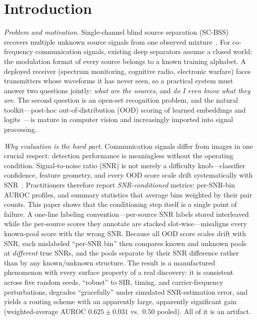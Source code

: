 \documentclass[review,12pt]{elsarticle}
\begin{document}
\linenumbers

\section{Introduction}
\label{sec:intro}

\emph{Problem and motivation.} Single-channel blind source separation
(SC-BSS) recovers multiple unknown source signals from one observed
mixture~\cite{hou2022single,guo2024single}. For co-frequency
communication signals, existing deep separators assume a closed world:
the modulation format of every source belongs to a known training
alphabet. A deployed receiver (spectrum monitoring, cognitive radio,
electronic warfare) faces transmitters whose waveforms it has never
seen, so a practical system must answer two questions jointly:
\emph{what are the sources}, and \emph{do I even know what they are}.
The second question is an open-set recognition problem, and the natural
toolkit---post-hoc out-of-distribution (OOD) scoring of learned
embeddings and
logits~\cite{hendrycks2017msp,liang2018odin,liu2020energy,lee2018mahalanobis,du2022vos}---is
mature in computer vision and increasingly imported into signal
processing.

\emph{Why evaluation is the hard part.} Communication signals differ
from images in one crucial respect: detection performance is
meaningless without the operating condition. Signal-to-noise ratio (SNR)
is not merely a difficulty knob---classifier confidence, feature
geometry, and every OOD score scale drift systematically with
SNR~\cite{proakis2008digital,oshea2017intro}. Practitioners therefore
report \emph{SNR-conditioned} metrics: per-SNR-bin AUROC profiles, and
summary statistics that average bins weighted by their pair counts.
This paper shows that the conditioning step itself is a single point of
failure. A one-line labeling convention---per-source SNR labels stored
interleaved while the per-source scores they annotate are stacked
slot-wise---misaligns every known-pool score with the wrong SNR. Because
all OOD score scales drift with SNR, each mislabeled ``per-SNR bin''
then compares known and unknown pools at \emph{different} true SNRs,
and the pools separate by their SNR difference rather than by any
known/unknown structure. The result is a manufactured phenomenon with
every surface property of a real discovery: it is consistent across
five random seeds, ``robust'' to SIR, timing, and carrier-frequency
perturbations, degrades ``gracefully'' under simulated SNR-estimation
error, and yields a routing scheme with an apparently large, apparently
significant gain (weighted-average AUROC $0.625 \pm 0.031$ vs.\ $0.50$
pooled). All of it is an artifact.
\end{document}

